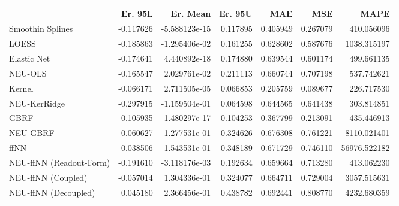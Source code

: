 \begin{tabular}{lrrrrrr}
\toprule
{} &   Er. 95L &      Er. Mean &   Er. 95U &       MAE &       MSE &          MAPE \\
\midrule
Smoothin Splines        & -0.117626 & -5.588123e-15 &  0.117895 &  0.405949 &  0.267079 &    410.056096 \\
LOESS                   & -0.185863 & -1.295406e-02 &  0.161255 &  0.628602 &  0.587676 &   1038.315197 \\
Elastic Net             & -0.174641 &  4.440892e-18 &  0.174880 &  0.639544 &  0.601174 &    499.661135 \\
NEU-OLS                 & -0.165547 &  2.029761e-02 &  0.211113 &  0.660744 &  0.707198 &    537.742621 \\
Kernel                  & -0.066171 &  2.711505e-05 &  0.066853 &  0.205759 &  0.089677 &    226.717530 \\
NEU-KerRidge            & -0.297915 & -1.159504e-01 &  0.064598 &  0.644565 &  0.641438 &    303.814851 \\
GBRF                    & -0.105935 & -1.480297e-17 &  0.104253 &  0.367799 &  0.213091 &    435.446913 \\
NEU-GBRF                & -0.060627 &  1.277531e-01 &  0.324626 &  0.676308 &  0.761221 &   8110.021401 \\
ffNN                    & -0.038506 &  1.543531e-01 &  0.348189 &  0.671729 &  0.746110 &  56976.522182 \\
NEU-ffNN (Readout-Form) & -0.191610 & -3.118176e-03 &  0.192634 &  0.659664 &  0.713280 &    413.062230 \\
NEU-ffNN (Coupled)      & -0.057014 &  1.304336e-01 &  0.324077 &  0.664711 &  0.729004 &   3057.515631 \\
NEU-ffNN (Decoupled)    &  0.045180 &  2.366456e-01 &  0.438782 &  0.692441 &  0.808770 &   4232.680359 \\
\bottomrule
\end{tabular}
